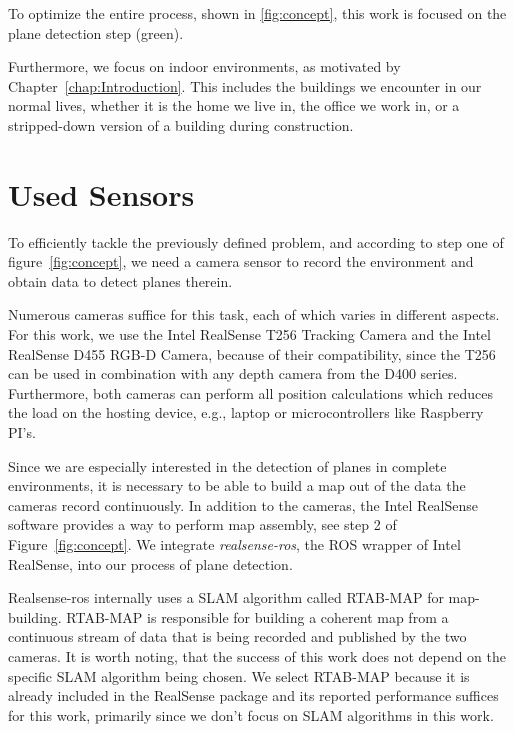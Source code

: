 \documentclass[main.tex]{subfiles}
\begin{document}
To optimize the entire process, shown in \ref{fig:concept}, this work is focused on the plane detection step (green).

Furthermore, we focus on indoor environments, as motivated by Chapter~\ref{chap:Introduction}.
This includes the buildings we encounter in our normal lives, whether it is the home we live in, the office we work in, or a stripped-down version of a building during construction.




\section{Used Sensors}
To efficiently tackle the previously defined problem, and according to step one of figure~\ref{fig:concept}, we need a camera sensor to record the environment and obtain data to detect planes therein.

Numerous cameras suffice for this task, each of which varies in different aspects.
For this work, we use the Intel RealSense T256 Tracking Camera and the Intel RealSense D455 RGB-D Camera, because of their compatibility,
since the T256 can be used in combination with any depth camera from the D400 series. Furthermore, both cameras can perform all position calculations which
reduces the load on the hosting device, e.g., laptop or microcontrollers like Raspberry PI's.

Since we are especially interested in the detection of planes in complete environments, it is necessary to be able to build a map out of the data the cameras
record continuously.
In addition to the cameras, the Intel RealSense software provides a way to perform map assembly, see step 2 of Figure~\ref{fig:concept}.%
We integrate \textit{realsense-ros}, the ROS wrapper of Intel RealSense, into our process of plane detection.

Realsense-ros internally uses a SLAM algorithm called RTAB-MAP \cite{Labbé_Michaud_2019} for map-building.
RTAB-MAP is responsible for building a coherent map from a continuous stream of data that is being recorded and published by the two cameras.
It is worth noting, that the success of this work does not depend on the specific SLAM algorithm being chosen. We select RTAB-MAP because
it is already included in the RealSense package and its reported performance suffices for this work, primarily since we don't focus on SLAM
algorithms in this work.
\end{document}
